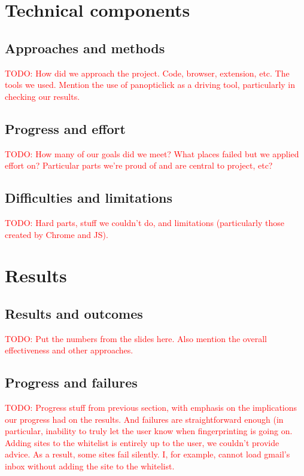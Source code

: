 \documentclass[12pt,a4paper]{article}
\begin{document}
\section{Technical components}
\subsection{Approaches and methods}
\textcolor{red}{TODO: How did we approach the project. Code, browser, extension, etc. The tools we used. Mention the use of panopticlick as a driving tool, particularly in checking our results.}

\subsection{Progress and effort}
\textcolor{red}{TODO: How many of our goals did we meet? What places failed but we applied effort on? Particular parts we're proud of and are central to project, etc?}

\subsection{Difficulties and limitations}
\textcolor{red}{TODO: Hard parts, stuff we couldn't do, and limitations (particularly those created by Chrome and JS).}

\section{Results}
\subsection{Results and outcomes}
\textcolor{red}{TODO: Put the numbers from the slides here. Also mention the overall effectiveness and other approaches.}

\subsection{Progress and failures}
\textcolor{red}{TODO: Progress stuff from previous section, with emphasis on the implications our progress had on the results. And failures are straightforward enough (in particular, inability to truly let the user know when fingerprinting is going on. Adding sites to the whitelist is entirely up to the user, we couldn't provide advice. As a result, some sites fail silently. I, for example, cannot load gmail's inbox without adding the site to the whitelist.}
\end{document}
